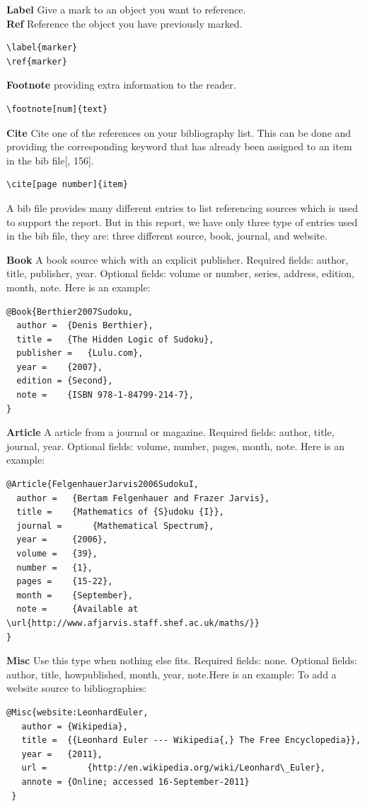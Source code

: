 \documentclass[11pt]{report}
\begin{document}
\textbf{Label} Give a mark to an object you want to reference.\\
\textbf{Ref} Reference the object you have previously marked.
\begin{verbatim}
\label{marker}
\ref{marker}
\end{verbatim}

\textbf{Footnote} providing extra information to the reader.
\begin{verbatim}
\footnote[num]{text}
\end{verbatim}

\textbf{Cite} Cite one of the references on your bibliography list. This can be done and providing the corresponding keyword that has already been assigned to an item in the bib file[\cite{Lamport1994LATEX}, 156].
\begin{verbatim}
\cite[page number]{item}
\end{verbatim}

A bib file provides many different entries to list referencing sources which is used to support the report. But in this report, we have only three type of entries used in the bib file, they are: three different source, book, journal, and website.

\textbf{Book} A book source which with an explicit publisher. Required fields: author, title, publisher, year. Optional fields: volume or number, series, address, edition, month, note. Here is an example:
\begin{verbatim}
@Book{Berthier2007Sudoku,
  author =	{Denis Berthier},
  title =	{The Hidden Logic of Sudoku},
  publisher =	{Lulu.com},
  year =	{2007},
  edition =	{Second},
  note =	{ISBN 978-1-84799-214-7},
}
\end{verbatim}
\textbf{Article} A article from a journal or magazine. Required fields: author, title, journal, year. Optional fields: volume, number, pages, month, note. Here is an example:
\begin{verbatim}
@Article{FelgenhauerJarvis2006SudokuI,
  author = 	 {Bertam Felgenhauer and Frazer Jarvis},
  title = 	 {Mathematics of {S}udoku {I}},
  journal = 	 {Mathematical Spectrum},
  year = 	 {2006},
  volume =	 {39},
  number =	 {1},
  pages =	 {15-22},
  month =	 {September},
  note =	 {Available at \url{http://www.afjarvis.staff.shef.ac.uk/maths/}}
}
\end{verbatim}
\textbf{Misc} Use this type when nothing else fits. Required fields: none. Optional fields: author, title, howpublished, month, year, note.Here is an example:
To add a website source to bibliographies:
\begin{verbatim}
@Misc{website:LeonhardEuler,
   author =	{Wikipedia},
   title =	{{Leonhard Euler --- Wikipedia{,} The Free Encyclopedia}},
   year =	{2011},
   url =		{http://en.wikipedia.org/wiki/Leonhard\_Euler},
   annote =	{Online; accessed 16-September-2011}
 }
\end{verbatim}
\end{document}
